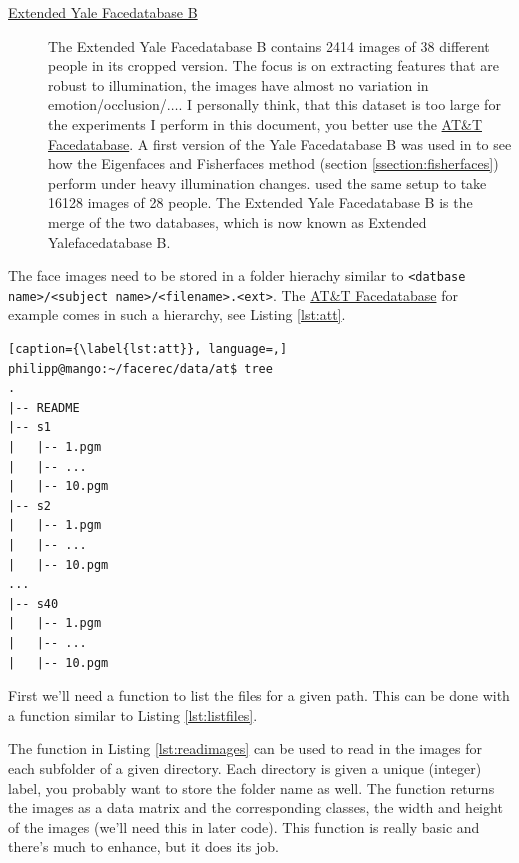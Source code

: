\begin{description}
	\item[\href{http://vision.ucsd.edu/~leekc/ExtYaleDatabase/ExtYaleB.html}{Extended Yale Facedatabase B}] The Extended Yale Facedatabase B contains 2414 images of 38 different people in its cropped version. The focus is on extracting features that are robust to illumination, the images have almost no variation in emotion/occlusion/$\ldots$. I personally think, that this dataset is too large for the experiments I perform in this document, you better use the \href{http://www.cl.cam.ac.uk/research/dtg/attarchive/facedatabase.html}{AT\&T Facedatabase}. A first version of the Yale Facedatabase B was used in \cite{belhumeru97} to see how the Eigenfaces and Fisherfaces method (section \ref{ssection:fisherfaces}) perform under heavy illumination changes. \cite{Lee2005} used the same setup to take 16128 images of 28 people. The Extended Yale Facedatabase B is the merge of the two databases, which is now known as Extended Yalefacedatabase B.

\end{description}

The face images need to be stored in a folder hierachy similar to \lstinline|<datbase name>/<subject name>/<filename>.<ext>|. The \href{http://www.cl.cam.ac.uk/research/dtg/attarchive/facedatabase.html}{AT\&T Facedatabase} for example comes in such a hierarchy, see Listing \ref{lst:att}.

\begin{lstlisting}[caption={\label{lst:att}}, language=,]
philipp@mango:~/facerec/data/at$ tree
.
|-- README
|-- s1
|   |-- 1.pgm
|   |-- ...
|   |-- 10.pgm
|-- s2
|   |-- 1.pgm
|   |-- ...
|   |-- 10.pgm
...
|-- s40
|   |-- 1.pgm
|   |-- ...
|   |-- 10.pgm
\end{lstlisting}

\ifx\python\undefined
	First we'll need a function to list the files for a given path. This can be done with a function similar to Listing \ref{lst:listfiles}.
	
	
\fi

The function in Listing \ref{lst:readimages} can be used to read in the images for each subfolder of a given directory. Each directory is given a unique (integer) label, you probably want to store the folder name as well. The function returns the images\ifx\python\undefined{} as a data matrix\fi{} and the corresponding classes\ifx\python\undefined, the width and height of the images (we'll need this in later code)\fi{}. This function is really basic and there's much to enhance, but it does its job.

